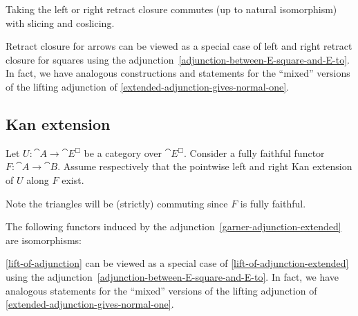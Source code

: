 \documentclass[reqno,10pt,a4paper,oneside]{amsart}
\begin{document}
\begin{remark}
\label{retract-closure-extended-slicing}
Taking the left or right retract closure commutes (up to natural isomorphism) with slicing and coslicing.
\end{remark}

\begin{remark}
\label{slicing-mixed}
Retract closure for arrows can be viewed as a special case of left and right retract closure for squares using the adjunction~\eqref{adjunction-between-E-square-and-E-to}.
In fact, we have analogous constructions and statements for the ``mixed'' versions of the lifting adjunction of \cref{extended-adjunction-gives-normal-one}.
\end{remark}

\subsection{Kan extension}

Let $U : \cat{A} \to \cat{E}^{\Box}$ be a category over $\cat{E}^{\Box}$.
Consider a fully faithful functor $F : \cat{A} \to \cat{B}$.
Assume respectively that the pointwise left and right Kan extension of $U$ along $F$ exist.
Note the triangles will be (strictly) commuting since $F$ is fully faithful.

\begin{lemma}
\label{kan-extension-closure-extended}
The following functors induced by the adjunction~\eqref{garner-adjunction-extended} are isomorphisms:
\end{lemma}

\begin{remark}
\label{kan-extension-closure-mixed}
\cref{lift-of-adjunction} can be viewed as a special case of \cref{lift-of-adjunction-extended} using the adjunction~\eqref{adjunction-between-E-square-and-E-to}.
In fact, we have analogous statements for the ``mixed'' versions of the lifting adjunction of \cref{extended-adjunction-gives-normal-one}.
\end{remark}
\end{document}

